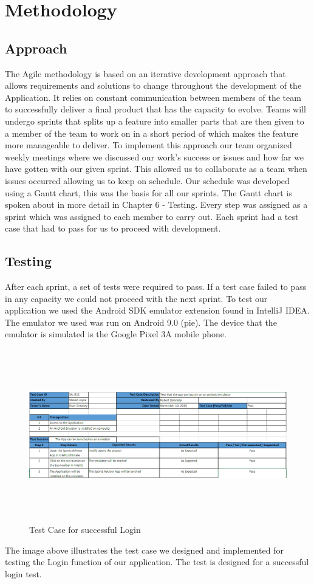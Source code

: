 \chapter{Methodology}
\section{Approach}
The Agile methodology is based on an iterative development approach that allows requirements and solutions to change throughout the development of the Application. It relies on constant communication between members of the team to successfully deliver a final product that has the capacity to evolve. Teams will undergo sprints that splits up a feature into smaller parts that are then given to a member of the team to work on in a short period of which makes the feature more manageable to deliver.
\newline
\newline
To implement this approach our team organized weekly meetings where we discussed our work’s success or issues and how far we have gotten with our given sprint. This allowed us to collaborate as a team when issues occurred allowing us to keep on schedule. Our schedule was developed using a Gantt chart, this was the basis for all our sprints. The Gantt chart is spoken about in more detail in Chapter 6 - Testing. Every step was assigned as a sprint which was assigned to each member to carry out. Each sprint had a test case that had to pass for us to proceed with development.
\section{Testing}
After each sprint, a set of tests were required to pass. If a test case failed to pass in any capacity we could not proceed with the next sprint. To test our application we used the Android SDK emulator extension found in IntelliJ IDEA. The emulator we used was run on Android 9.0 (pie). The device that the emulator is simulated is the Google Pixel 3A mobile phone.
\begin{figure}[H]
    \centering
    \includegraphics[width=15cm, height = 7.5cm]{img/EmulatorLaunch.PNG}
    \caption{Test Case for successful Login}
    \label{fig:altas config}
\end{figure}
The image above illustrates the test case we designed and implemented for testing the Login function of our application. The test is designed for a successful login test.
